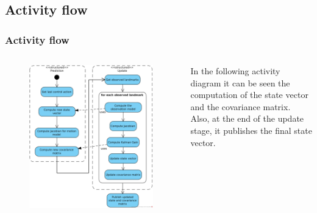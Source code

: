 \documentclass{beamer}
\begin{document}
    \subsection{Activity flow}
    \begin{frame}
        \justifying
        \frametitle{Activity flow}

        \begin{columns}
            \begin{column}{0.5\textwidth}
                \begin{figure}
                    \centering
                    \includegraphics[width=\textwidth]{activity.png}
                \end{figure}
            \end{column}
            \begin{column}{0.5\textwidth}
                In the following activity diagram it can be seen the computation of the state vector and the covariance matrix. \\[10pt]

                Also, at the end of the update stage, it publishes the final state vector.
            \end{column}
        \end{columns}


    \end{frame}
\end{document}
